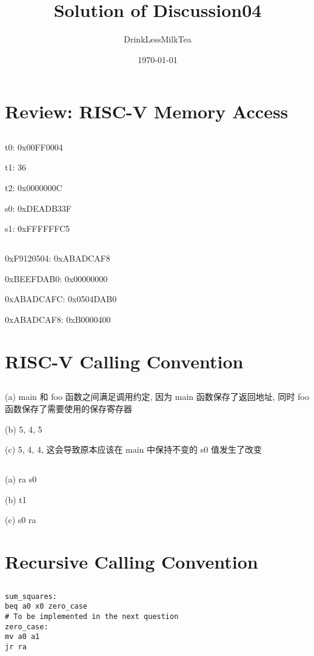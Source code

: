 \documentclass[UTF8,nofonts]{ctexart}
\title{Solution of Discussion04}
\author{DrinkLessMilkTea}
\date{\today}
\begin{document}
\maketitle
\section{Review: RISC-V Memory Access}
\subsection{}
t0: 0x00FF0004

t1: 36

t2: 0x0000000C

s0: 0xDEADB33F

s1: 0xFFFFFFC5

\subsection{}

0xF9120504: 0xABADCAF8

0xBEEFDAB0: 0x00000000

0xABADCAFC: 0x0504DAB0

0xABADCAF8: 0xB0000400

\section{RISC-V Calling Convention}
\subsection{}
(a) main 和 foo 函数之间满足调用约定, 因为 main 函数保存了返回地址, 同时 foo 函数保存了需要使用的保存寄存器

(b) 5, 4, 5

(c) 5, 4, 4, 这会导致原本应该在 main 中保持不变的 s0 值发生了改变

\subsection{}
(a) ra s0

(b) t1

(c) s0 ra

\section{Recursive Calling Convention}
\subsection{}
\begin{verbatim}
sum_squares:
beq a0 x0 zero_case
# To be implemented in the next question
zero_case:
mv a0 a1
jr ra
\end{verbatim}
\end{document}
